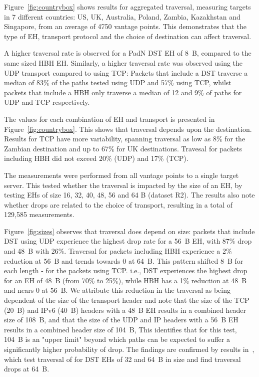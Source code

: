 \documentclass[conference]{IEEEtran}
\begin{document}
Figure~\ref{fig:countrybox} shows results for aggregated traversal, measuring targets in 7 different countries: US, UK, Australia, Poland, Zambia, Kazakhstan and Singapore, from an average of 4750 vantage points. This demonstrates that the type of EH, transport protocol and the choice of destination can affect traversal.

A higher traversal rate is observed for a PadN DST EH of 8~B, compared to the same sized HBH EH. Similarly, a higher traversal rate was observed using the UDP transport compared to using TCP: Packets that include a DST traverse a median of 83\% of the paths tested using UDP and 57\% using TCP, whilst packets that include a HBH only traverse a median of 12 and 9\% of paths for UDP and TCP respectively.

The values for each combination of EH and transport is presented in Figure~\ref{fig:countrybox}. This shows that traversal depends upon the destination. Results for TCP have more variability, spanning traversal as low as 8\% for the Zambian destination and up to 67\% for UK destinations. Travesal for packets including HBH did not exceed 20\% (UDP) and 17\% (TCP).

The measurements were performed from all vantage points to a single target server. This tested whether the traversal is impacted by the size of an EH, by testing EHs of size 16, 32, 40, 48, 56 and 64 B (dataset R2). The results also note whether drops are related to the choice of transport, resulting in a total of 129,585 measurements.
 
Figure~\ref{fig:sizes} observes that traversal does depend on size: packets that include DST using UDP experience the highest drop rate for a 56~B EH, with  87\% drop and 48~B with 26\%. Traversal for packets including HBH experience a 2\% reduction at 56~B and trends towards 0 at 64~B.
This pattern shifted 8~B for each length - for the packets  using TCP. i.e., DST experiences the highest drop for an EH of 48~B (from 70\% to 25\%), while HBH has a 1\% reduction at 48~B and nears 0 at 56~B.
We attribute this reduction in the traversal as being dependent of the size of the transport header and note that the size of the TCP (20~B) and IPv6 (40~B) headers with a 48~B EH results in a combined header size of 108~B, and that the size of the UDP and IP headers with a 56~B EH results in a combined header size of 104~B, This identifies that for this test,  104~B is an "upper limit" beyond which paths can be expected to suffer a significantly higher probability of drop.
The findings are confirmed by results in~\cite{james-imc}, which test traversal of for DST EHs of 32 and 64~B in size and find traversal drops at 64~B. 
\end{document}

